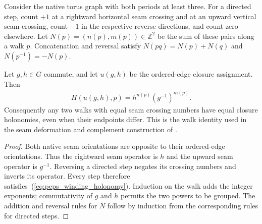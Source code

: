\begin{lemma}%
    \label{thm:peps_torus_walk_winding}
    \leanok
    Consider the native torus graph with both periods at least three.
    For a directed step, count $+1$ at a rightward horizontal seam
    crossing and at an upward vertical seam crossing, count $-1$ in
    the respective reverse directions, and count zero elsewhere.
    Let $N(p)=(n(p),m(p))\in\mathbb Z^2$ be the sum of these pairs
    along a walk $p$. Concatenation and reversal satisfy
    $N(pq)=N(p)+N(q)$ and $N(p^{-1})=-N(p)$.

    Let $g,h\in G$ commute, and let $u(g,h)$ be the ordered-edge
    closure assignment. Then
    \begin{align}
        H(u(g,h),p)=h^{n(p)}(g^{-1})^{m(p)}.
        \label{eq:peps_winding_holonomy}
    \end{align}
    Consequently any two walks with equal seam crossing numbers have
    equal closure holonomies, even when their endpoints differ.
    This is the walk identity used in the seam deformation and
    complement construction of
    \cite[\S5.3 and proof of Theorem~6.9]{Schuch2010PEPS}.
\end{lemma}

\begin{proof}\leanok
    Both native seam orientations are opposite to their ordered-edge
    orientations. Thus the rightward seam operator is $h$ and the
    upward seam operator is $g^{-1}$. Reversing a directed step
    negates its crossing numbers and inverts its operator. Every step
    therefore satisfies~(\ref{eq:peps_winding_holonomy}). Induction on
    the walk adds the integer exponents; commutativity of $g$ and $h$
    permits the two powers to be grouped. The addition and reversal
    rules for $N$ follow by induction from the corresponding rules for
    directed steps.
\end{proof}

